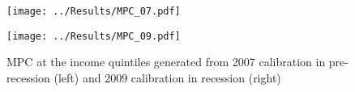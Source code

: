 \documentclass{beamer}
\begin{document}
\begin{frame}{}
\begin{figure}[h!]
	\begin{minipage}[b]{0.45\linewidth}
		\centering
		\texttt{[image: ../Results/MPC\_07.pdf]}
	\end{minipage}
	\hspace{0.5cm}
	\begin{minipage}[b]{0.45\linewidth}
		\centering
		\texttt{[image: ../Results/MPC\_09.pdf]}
	\end{minipage}
	\caption{\tiny MPC at the income quintiles generated from 2007 calibration in pre-recession (left) and 2009 calibration in recession (right)}
\end{figure}
\end{frame}



\begin{comment}
\section{\scshape Simple Estimate of the APC}
\begin{frame}{Simple Estimate of the APC}
	\begin{center}
		\begin{figure}[H]
			\begin{minipage}[b]{0.6\linewidth}
				\centering
				\texttt{[image: ../Results/cons\_DSZ\_dates.pdf]}
			\end{minipage}
			\caption{\tiny PSID Average consumption rates divided by average income, by income quintile (identity of households fixed at the beginning of the period)}
		\end{figure}
	\end{center}
\end{frame}
\end{comment}



\end{document}
